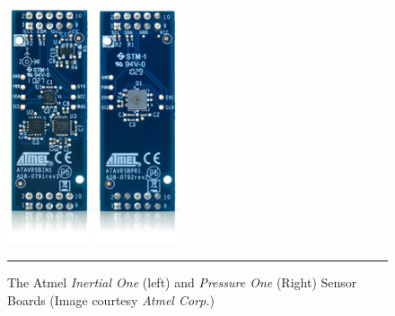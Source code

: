 \begin{figure}
	\centering
		\includegraphics[height=70mm]{./Figures/Inertial1.jpg}
		\includegraphics[height=70mm]{./Figures/Pressure1.jpg}
	\rule{35em}{0.5pt}
	\caption[Atmel Sensor Boards]{The Atmel \emph{Inertial One} (left) and \emph{Pressure One} (Right) Sensor Boards (Image courtesy \textit{Atmel Corp.})}
	\label{fig:micropendous}
\end{figure}

